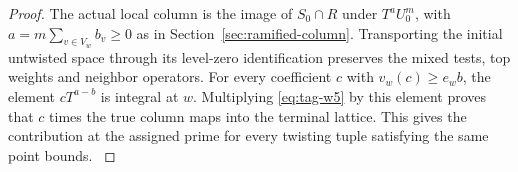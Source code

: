 \begin{proof}
The actual local column is the image of \(S_0\cap R\) under
\(T^{a}U_0^m\), with \(a=m\sum_{v\in V_w} b_v\ge0\) as in
Section~\ref{sec:ramified-column}. Transporting the initial
untwisted space through its level-zero identification preserves
the mixed tests, top weights and neighbor operators. For every
coefficient \(c\) with \(v_w(c)\ge e_w b\), the element
\(cT^{a-b}\) is integral at \(w\). Multiplying \eqref{eq:tag-w5} by this
element proves that \(c\) times the true column maps into the
terminal lattice. This gives the contribution at the assigned prime for
every twisting tuple satisfying the same point bounds.
\label{cor:word-period-2}
\end{proof}

